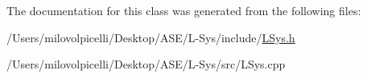 The documentation for this class was generated from the following files\+:\begin{DoxyCompactItemize}
\item 
/\+Users/milovolpicelli/\+Desktop/\+A\+S\+E/\+L-\/\+Sys/include/\hyperlink{_l_sys_8h}{L\+Sys.\+h}\item 
/\+Users/milovolpicelli/\+Desktop/\+A\+S\+E/\+L-\/\+Sys/src/L\+Sys.\+cpp\end{DoxyCompactItemize}
